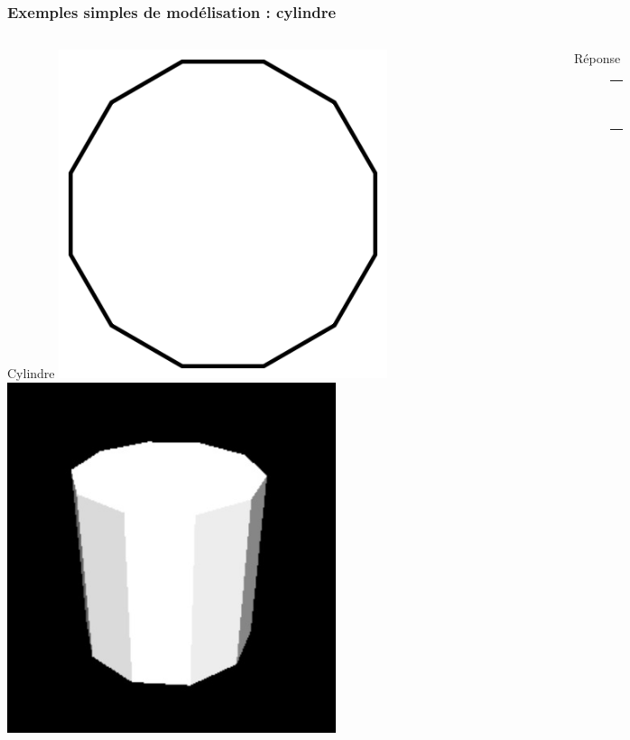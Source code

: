 \documentclass{beamer}
\begin{document}
\begin{frame}[fragile]
\frametitle{Exemples simples de modélisation : cylindre}
	\vspace{-5mm}
	\begin{columns}[T]
		\begin{column}{0.45\textwidth}
			\begin{block}{Cylindre}
			\centering
				\includegraphics[width=0.6\textwidth]{img/cone_base}
				~\\
				\includegraphics[width=0.6\textwidth]{img/cylindre}
			\end{block}
		\end{column}
		\pause
		\begin{column}{0.45\textwidth}
			\begin{exampleblock}{Réponse}
				\begin{figure}[h]
					\begin{tabular}{c}
						\centering
						\begin{lstlisting}[basicstyle=\small]


\end{lstlisting}
\end{tabular}
\end{figure}
\end{exampleblock}
\end{column}
\end{columns}
\end{frame}
\end{document}
